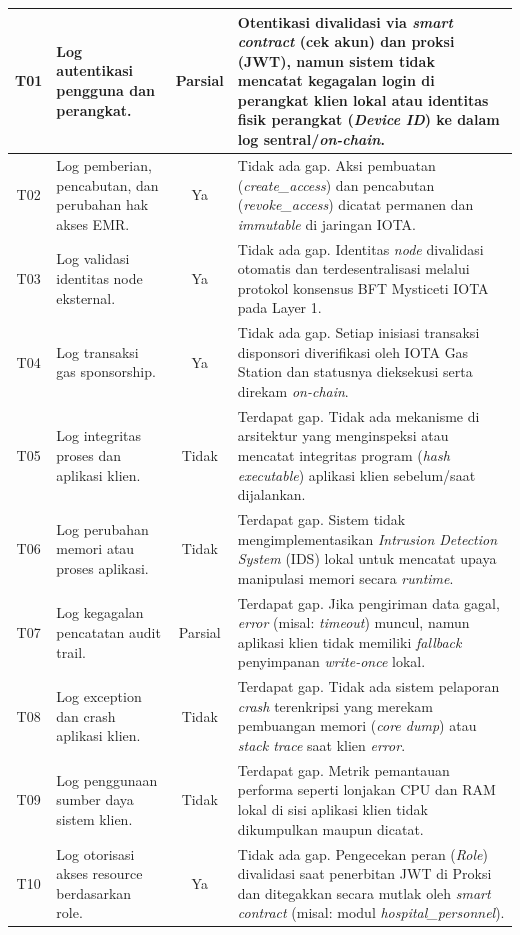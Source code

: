 \begin{xltabular}{\textwidth}{|c|>{\raggedright\arraybackslash}X|c|p{6cm}|}
    T01 & Log autentikasi pengguna dan perangkat. & Parsial & Otentikasi divalidasi via \textit{smart contract} (cek akun) dan proksi (JWT), namun sistem tidak mencatat kegagalan login di perangkat klien lokal atau identitas fisik perangkat (\textit{Device ID}) ke dalam log sentral/\textit{on-chain}. \\
    \hline
    T02 & Log pemberian, pencabutan, dan perubahan hak akses EMR. & Ya & Tidak ada gap. Aksi pembuatan (\textit{create\_access}) dan pencabutan (\textit{revoke\_access}) dicatat permanen dan \textit{immutable} di jaringan IOTA. \\
    \hline
    T03 & Log validasi identitas node eksternal. & Ya & Tidak ada gap. Identitas \textit{node} divalidasi otomatis dan terdesentralisasi melalui protokol konsensus BFT Mysticeti IOTA pada Layer 1. \\
    \hline
    T04 & Log transaksi gas sponsorship. & Ya & Tidak ada gap. Setiap inisiasi transaksi disponsori diverifikasi oleh IOTA Gas Station dan statusnya dieksekusi serta direkam \textit{on-chain}. \\
    \hline
    T05 & Log integritas proses dan aplikasi klien. & Tidak & Terdapat gap. Tidak ada mekanisme di arsitektur yang menginspeksi atau mencatat integritas program (\textit{hash executable}) aplikasi klien sebelum/saat dijalankan. \\
    \hline
    T06 & Log perubahan memori atau proses aplikasi. & Tidak & Terdapat gap. Sistem tidak mengimplementasikan \textit{Intrusion Detection System} (IDS) lokal untuk mencatat upaya manipulasi memori secara \textit{runtime}. \\
    \hline
    T07 & Log kegagalan pencatatan audit trail. & Parsial & Terdapat gap. Jika pengiriman data gagal, \textit{error} (misal: \textit{timeout}) muncul, namun aplikasi klien tidak memiliki \textit{fallback} penyimpanan \textit{write-once} lokal. \\
    \hline
    T08 & Log exception dan crash aplikasi klien. & Tidak & Terdapat gap. Tidak ada sistem pelaporan \textit{crash} terenkripsi yang merekam pembuangan memori (\textit{core dump}) atau \textit{stack trace} saat klien \textit{error}. \\
    \hline
    T09 & Log penggunaan sumber daya sistem klien. & Tidak & Terdapat gap. Metrik pemantauan performa seperti lonjakan CPU dan RAM lokal di sisi aplikasi klien tidak dikumpulkan maupun dicatat. \\
    \hline
    T10 & Log otorisasi akses resource berdasarkan role. & Ya & Tidak ada gap. Pengecekan peran (\textit{Role}) divalidasi saat penerbitan JWT di Proksi dan ditegakkan secara mutlak oleh \textit{smart contract} (misal: modul \textit{hospital\_personnel}). \\

\end{xltabular}

